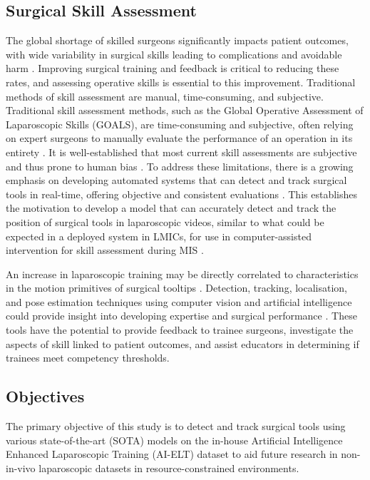 \subsection{Surgical Skill Assessment}

The global shortage of skilled surgeons significantly impacts patient outcomes, with wide variability in surgical skills leading to complications and avoidable harm \cite{jin_tool_2018}. Improving surgical training and feedback is critical to reducing these rates, and assessing operative skills is essential to this improvement. Traditional methods of skill assessment are manual, time-consuming, and subjective. Traditional skill assessment methods, such as the Global Operative Assessment of Laparoscopic Skills (GOALS), are time-consuming and subjective, often relying on expert surgeons to manually evaluate the performance of an operation in its entirety \cite{vassiliou_global_2005}. It is well-established that most current skill assessments are subjective and thus prone to human bias \cite{paley_crowdsourced_2021, levin_automated_2019}. To address these limitations, there is a growing emphasis on developing automated systems that can detect and track surgical tools in real-time, offering objective and consistent evaluations \cite{loza_realtime_2024}. This establishes the motivation to develop a model that can accurately detect and track the position of surgical tools in laparoscopic videos, similar to what could be expected in a deployed system in LMICs, for use in computer-assisted intervention for skill assessment during MIS \cite{nwoye_cholectrack20_2023}. 

An increase in laparoscopic training may be directly correlated to characteristics in the motion primitives of surgical tooltips \cite{retrosi_motion_2015}. Detection, tracking, localisation, and pose estimation techniques using computer vision and artificial intelligence could provide insight into developing expertise and surgical performance \cite{bodenstedt_comparative_2018, allan_toward_2013, constable_enhancing_2024}. These tools have the potential to provide feedback to trainee surgeons, investigate the aspects of skill linked to patient outcomes, and assist educators in determining if trainees meet competency thresholds.

\subsection{Objectives}

The primary objective of this study is to detect and track surgical tools using various state-of-the-art (SOTA) models on the in-house Artificial Intelligence Enhanced Laparoscopic Training (AI-ELT) dataset to aid future research in non-in-vivo laparoscopic datasets in resource-constrained environments.

